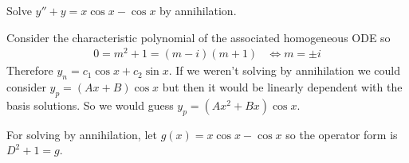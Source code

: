 \documentclass[notes]{subfiles}
\begin{document}
\begin{exercise}
    Solve $y'' + y = x\cos x - \cos x$ by annihilation.
\end{exercise}
\begin{solution}
    Consider the characteristic polynomial of the associated homogeneous ODE so
    \begin{align*}
        0 = m^2 + 1 = (m - i)(m + 1)
        &\iff m = \pm i
    \end{align*}
    Therefore $y_n = c_1 \cos x + c_2 \sin x$. If we weren't solving by annihilation we could consider $y_p = (Ax + B)\cos x$ but then it would be linearly dependent with the basis solutions. So we would guess $y_p = (Ax^2 + Bx)\cos x$.
    
    For solving by annihilation, let $g(x) = x\cos x - \cos x$ so the operator form is $D^2 + 1 = g$.


\end{solution}
\end{document}
